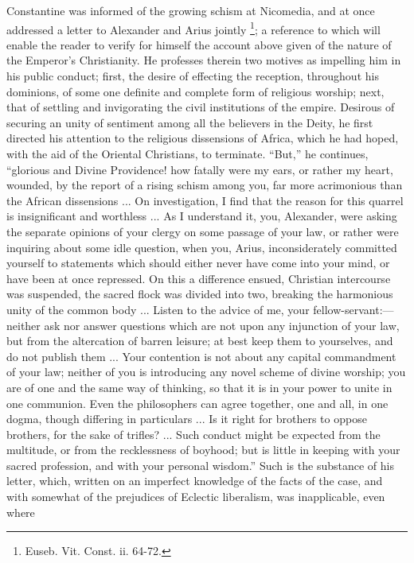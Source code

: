 Constantine was informed of the growing schism at Nicomedia, and at
once addressed a letter to Alexander and Arius jointly \footnote{Euseb. Vit. Const. ii. 64-72.}; a reference to which will enable the reader to verify for
himself the account above given of the nature of the Emperor's
Christianity. He professes therein two motives as impelling him in his
public conduct; first, the desire of effecting the reception,
throughout his dominions, of some one definite and complete form of
religious worship; next, that of settling and invigorating the civil
institutions of the empire. Desirous of securing an unity of sentiment
among all the believers in the Deity, he first directed his attention
to the religious dissensions of Africa, which he had hoped, with
the aid of the Oriental Christians, to terminate. ``But,'' he
continues, ``glorious and Divine Providence! how fatally were my
ears, or rather my heart, wounded, by the report of a rising schism
among you, far more acrimonious than the African dissensions ... On
investigation, I find that the reason for this quarrel is
insignificant and worthless ... As I understand it, you, Alexander,
were asking the separate opinions of your clergy on some passage of
your law, or rather were inquiring about some idle question, when you,
Arius, inconsiderately committed yourself to statements which should
either never have come into your mind, or have been at once repressed.
On this a difference ensued, Christian intercourse was suspended, the
sacred flock was divided into two, breaking the harmonious unity of
the common body ... Listen to the advice of me, your fellow-servant:—neither
ask nor answer questions which are not upon any injunction of your
law, but from the altercation of barren leisure; at best keep them to
yourselves, and do not publish them ... Your contention is not about
any capital commandment of your law; neither of you is introducing any
novel scheme of divine worship; you are of one and the same way of
thinking, so that it is in your power to unite in one communion. Even
the philosophers can agree together, one and all, in one dogma, though
differing in particulars ... Is it right for brothers to oppose
brothers, for the sake of trifles? ... Such conduct might be expected
from the multitude, or from the recklessness of boyhood; but is little
in keeping with your sacred profession, and with your personal
wisdom.'' Such is the substance of his letter, which, written on
an imperfect knowledge of the facts of the case, and with somewhat of
the prejudices of Eclectic liberalism, was inapplicable, even where
